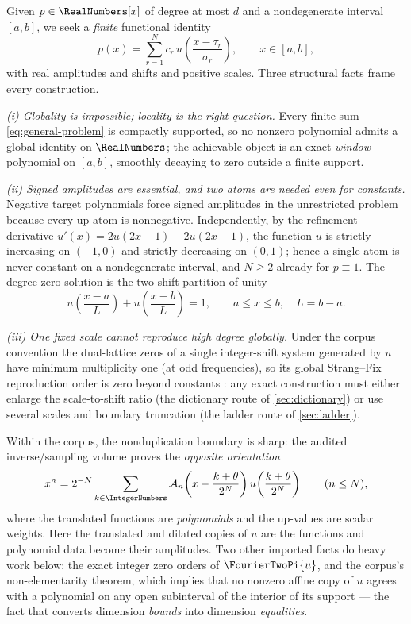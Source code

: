 \documentclass[11pt,oneside]{article}
\numberwithin{equation}{section}
\theoremstyle{definition}
\theoremstyle{remark}
\newcommand{\Gd}{\mathcal A}
\begin{document}
Given $p\in\RealNumbers[x]$ of degree at most $d$ and a nondegenerate interval
$[a,b]$, we seek a \emph{finite} functional identity
\begin{equation}
 p(x)=\sum_{r=1}^{N}c_r\,
 u\!\left(\frac{x-\tau_r}{\sigma_r}\right),
 \qquad x\in[a,b],
 \label{eq:general-problem}
\end{equation}
with real amplitudes and shifts and positive scales.  Three structural
facts frame every construction.

\emph{(i) Globality is impossible; locality is the right question.}
Every finite sum \eqref{eq:general-problem} is compactly supported,
so no nonzero polynomial admits a global identity on $\RealNumbers$; the
achievable object is an exact \emph{window} --- polynomial on
$[a,b]$, smoothly decaying to zero outside a finite support.

\emph{(ii) Signed amplitudes are essential, and two atoms are needed
even for constants.}  Negative target polynomials force signed amplitudes in
the unrestricted problem because every up-atom is nonnegative.  Independently,
by the refinement derivative
$u'(x)=2u(2x+1)-2u(2x-1)$, the function $u$ is strictly increasing on
$(-1,0)$ and strictly decreasing on $(0,1)$; hence a single atom is
never constant on a nondegenerate interval, and $N\ge2$ already for
$p\equiv1$.  The degree-zero solution is the two-shift partition of
unity
\begin{equation}
 u\!\left(\frac{x-a}{L}\right)
 +u\!\left(\frac{x-b}{L}\right)=1,
 \qquad a\le x\le b,\quad L=b-a.
 \label{eq:partition-interval}
\end{equation}

\emph{(iii) One fixed scale cannot reproduce high degree globally.}
Under the corpus convention the dual-lattice zeros of a single
integer-shift system generated by $u$ have minimum multiplicity one
(at odd frequencies), so its global Strang--Fix reproduction order is
zero beyond constants \cite{StrangFix1973,deBoorRon1992}: any exact
construction must either enlarge the scale-to-shift ratio (the
dictionary route of \cref{sec:dictionary}) or use several scales and
boundary truncation (the ladder route of \cref{sec:ladder}).

Within the corpus, the nonduplication boundary is sharp: the audited
inverse/sampling volume proves the \emph{opposite orientation}
\begin{equation}
 x^{n}=2^{-N}\sum_{k\in\IntegerNumbers}
 \Gd_n\!\left(x-\frac{k+\theta}{2^{N}}\right)
 u\!\left(\frac{k+\theta}{2^{N}}\right)
 \qquad(n\le N),
 \label{eq:opposite-orientation}
\end{equation}
where the translated functions are \emph{polynomials} and the
up-values are scalar weights.  Here the translated and dilated copies
of $u$ are the functions and polynomial data become their amplitudes.
Two other imported facts do heavy work below: the exact integer zero
orders of $\FourierTwoPi{u}$, and the corpus's non-elementarity theorem,
which implies that no nonzero affine copy of $u$ agrees with a
polynomial on any open subinterval of the interior of its support ---
the fact that converts dimension \emph{bounds} into dimension
\emph{equalities}.
\end{document}
